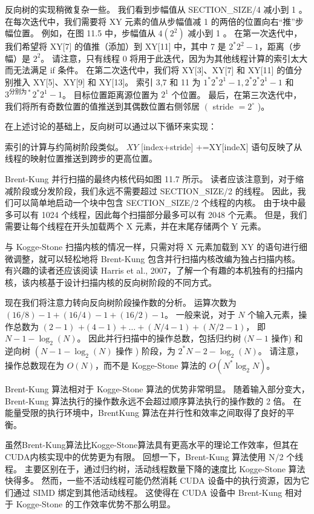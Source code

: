 反向树的实现稍微复杂一些。 我们看到步幅值从 SECTION\_SIZE/4 减小到 1 。 在每次迭代中，我们需要将 XY 元素的值从步幅值减 1 的两倍的位置向右“推”步幅位置。 例如，在图 11.5 中，步幅值从 $4\left(2^{2}\right)$ 减小到 1 。 在第一次迭代中，我们希望将 XY[7] 的值推（添加）到 XY[11] 中，其中 7 是 $2^{*} 2^{2}-1$，距离（步幅）是 $2^{ 2}$。 请注意，只有线程 0 将用于此迭代，因为为其他线程计算的索引太大而无法满足 if 条件。 在第二次迭代中，我们将 XY[3]、XY[7] 和 XY[11] 的值分别推入 XY[5]、XY[9] 和 XY[13]。 索引 3,7 和 11 为 $1^{*} 2^{*} 2^{1}-1,2^{*} 2^{*} 2^{1}-1$ 和 $3^{ 分别为*} 2^{*} 2^{1}-1$。 目标位置距离源位置为 $2^{1}$ 个位置。 最后，在第三次迭代中，我们将所有奇数位置的值推送到其偶数位置右侧邻居 $\left(\right.$ stride $=2^{\circ}$ )。

在上述讨论的基础上，反向树可以通过以下循环来实现：

索引的计算与约简树阶段类似。 $X Y$ [index+stride] +=XY[indeX] 语句反映了从线程的映射位置推送到跨步的更高位置。

Brent-Kung 并行扫描的最终内核代码如图 11.7 所示。 读者应该注意到，对于缩减阶段或分发阶段，我们永远不需要超过 SECTION\_SIZE/2 的线程。 因此，我们可以简单地启动一个块中包含 SECTION\_SIZE/2 个线程的内核。 由于块中最多可以有 1024 个线程，因此每个扫描部分最多可以有 2048 个元素。 但是，我们需要让每个线程在开头加载两个 X 元素，并在末尾存储两个 Y 元素。

与 Kogge-Stone 扫描内核的情况一样，只需对将 X 元素加载到 XY 的语句进行细微调整，就可以轻松地将 Brent-Kung 包含并行扫描内核改编为独占扫描内核。 有兴趣的读者还应该阅读 Harris et al., 2007，了解一个有趣的本机独有的扫描内核，该内核基于设计扫描内核的反向树阶段的不同方式。

现在我们将注意力转向反向树阶段操作数的分析。 运算次数为$(16 / 8)-1+(16 / 4)-1+(16 / 2)-1$。 一般来说，对于 $N$ 个输入元素，操作总数为 $(2-1)$ $+(4-1)+\ldots+(N / 4-1)+(N / 2-1)$， 即 $N-1-\log _{2}(N)$。 因此并行扫描中的操作总数，包括归约树 $(N-1$ 操作) 和逆向树 $\left(N-1-\log _{2}(N)\right.$ 操作 ) 阶段，为 $2^{*} N-2-\log _{2}(N)$。 请注意，操作总数现在为 $O(N)$，而不是 Kogge-Stone 算法的 $O\left(N^{*} \log _{2} N\right)$。

Brent-Kung 算法相对于 Kogge-Stone 算法的优势非常明显。 随着输入部分变大，Brent-Kung 算法执行的操作数永远不会超过顺序算法执行的操作数的 2 倍。 在能量受限的执行环境中，BrentKung 算法在并行性和效率之间取得了良好的平衡。


虽然Brent-Kung算法比Kogge-Stone算法具有更高水平的理论工作效率，但其在CUDA内核实现中的优势更为有限。 回想一下，Brent-Kung 算法使用 N/2 个线程。 主要区别在于，通过归约树，活动线程数量下降的速度比 Kogge-Stone 算法快得多。 然而，一些不活动线程可能仍然消耗 CUDA 设备中的执行资源，因为它们通过 SIMD 绑定到其他活动线程。 这使得在 CUDA 设备中 Brent-Kung 相对于 Kogge-Stone 的工作效率优势不那么明显。

